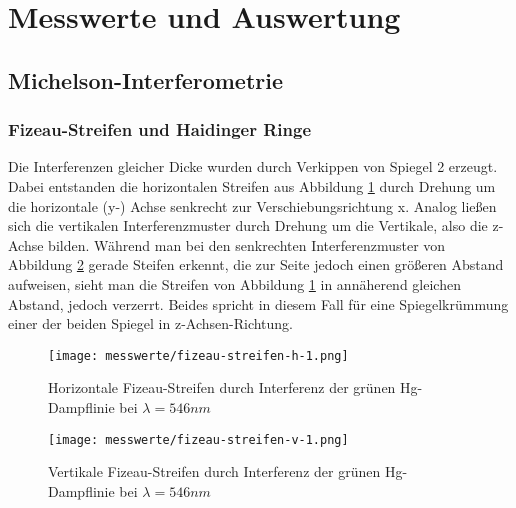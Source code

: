\section{Messwerte und Auswertung} %
\label{sec:messwerte_und_auswertung}

	\subsection{Michelson-Interferometrie} %
	\label{sub:michelson_interferometrie}
	
		\subsubsection{Fizeau-Streifen und Haidinger Ringe} %
		\label{ssub:fizeau_streifen}

			Die Interferenzen gleicher Dicke wurden durch Verkippen von Spiegel 2 erzeugt.
			Dabei entstanden die horizontalen Streifen aus Abbildung \ref{fig:fizeau-h-1} durch Drehung um die horizontale (y-) Achse senkrecht zur Verschiebungsrichtung x.
			Analog ließen sich die vertikalen Interferenzmuster durch Drehung um die Vertikale, also die z-Achse bilden.
			Während man bei den senkrechten Interferenzmuster von Abbildung \ref{fig:fizeau-v} gerade Steifen erkennt, die zur Seite jedoch einen größeren Abstand aufweisen, sieht man die Streifen von Abbildung \ref{fig:fizeau-h-1} in annäherend gleichen Abstand, jedoch verzerrt.
			Beides spricht in diesem Fall für eine Spiegelkrümmung einer der beiden Spiegel in z-Achsen-Richtung.
		
			\begin{figure}[htb]
				\centering
				\texttt{[image: messwerte/fizeau-streifen-h-1.png]}
				\caption{Horizontale Fizeau-Streifen durch Interferenz der grünen Hg-Dampflinie bei $\lambda = 546 \unit{nm}$}
				\label{fig:fizeau-h-1}
			\end{figure}

			\begin{figure}[htb]
				\centering
				\texttt{[image: messwerte/fizeau-streifen-v-1.png]}
				\caption{Vertikale Fizeau-Streifen durch Interferenz der grünen Hg-Dampflinie bei $\lambda = 546 \unit{nm}$}
				\label{fig:fizeau-v}
			\end{figure}

